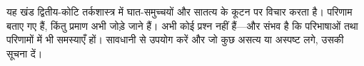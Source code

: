 \documentclass[../../../include/open-logic-chapter]{subfiles}
\begin{document}

\begin{editorial}
यह खंड द्वितीय-कोटि तर्कशास्त्र में घात-समुच्चयों और सातत्य के कूटन पर
विचार करता है। परिणाम बताए गए हैं, किंतु प्रमाण अभी जोड़े जाने हैं। अभी कोई
प्रश्न नहीं हैं---और संभव है कि परिभाषाओं तथा परिणामों में भी समस्याएँ हों।
सावधानी से उपयोग करें और जो कुछ असत्य या अस्पष्ट लगे, उसकी सूचना दें।
\end{editorial}





\OLEndChapterHook
\end{document}
